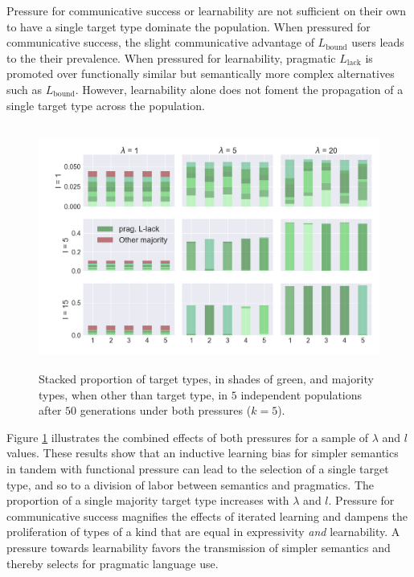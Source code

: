 \documentclass[a4paper, 11pt]{article}
\theoremstyle{Satz}
\newcommand{\mylang}[1]{\ensuremath{L_{\text{#1}}}\xspace} %
\newcommand{\Lbound}{\mylang{bound}}
\newcommand{\Llack}{\mylang{lack}}
\begin{document}
Pressure for communicative success or learnability are not sufficient on their own to have a
single target type dominate the population. When pressured for communicative success, the slight
communicative advantage of $\Lbound$ users leads to the their prevalence. When pressured for
learnability, pragmatic $\Llack$ is promoted over functionally similar but semantically more
complex alternatives such as $\Lbound$. However, learnability alone does not foment the
propagation of a single target type across the population.

\begin{figure}[t]
\centering
\includegraphics[width=1\textwidth,height=8cm,keepaspectratio]{./plots/fig3-r+m}
\caption{Stacked proportion of target types, in shades of green, and majority types, when other than target type, in $5$ independent populations after $50$ generations under both pressures ($k = 5$).}
\label{fig:rmd}
\end{figure}

Figure \ref{fig:rmd} illustrates the combined effects of both pressures for a sample of
$\lambda$ and $l$ values. These results show that an inductive learning bias for simpler
semantics in tandem with functional pressure can lead to the selection of a single target
type, and so to a division of labor between semantics and pragmatics.
The proportion of a single majority target type increases with $\lambda$ and
$l$. Pressure for communicative success magnifies the effects of iterated learning and dampens
the proliferation of types of a kind that are equal in expressivity {\em and} learnability. A
pressure towards learnability favors the transmission of simpler semantics and thereby selects
for pragmatic language use.
\end{document}
